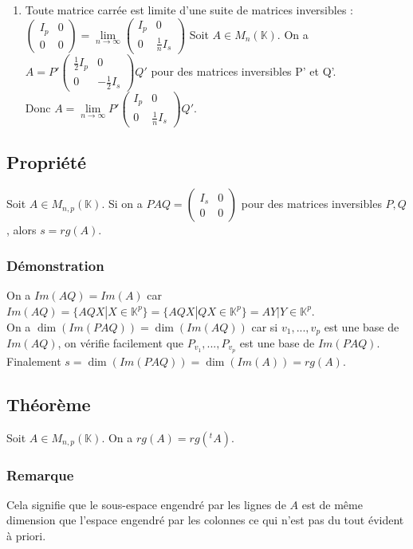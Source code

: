 \documentclass[a4paper,10pt]{book} %
\newcommand{\K}{\mathbb{K}}
\begin{document}
\begin{enumerate}
\item Toute matrice carrée est limite d'une suite de matrices inversibles :
$\begin{pmatrix}
I_p& 0\\
0& 0
\end{pmatrix}=\lim\limits_{n\rightarrow \infty}\begin{pmatrix}
I_p& 0\\
0&\frac{1}{n}I_s
\end{pmatrix}$
Soit $A\in M_n(\K)$. On a $A=P'\begin{pmatrix}
\frac{1}{2}I_p&0\\
0&-\frac{1}{2}I_s
\end{pmatrix}Q'$ pour des matrices inversibles P' et Q'.\\

Donc $A=\lim\limits_{n\rightarrow \infty}P'\begin{pmatrix}
I_p&0\\
0&\frac{1}{n}I_s
\end{pmatrix}Q'$.
\end{enumerate}

\subsection{Propriété}
Soit $A\in M_{n,p}(\mathbb{K})$. Si on a $PAQ=\begin{pmatrix}
I_s& 0\\
0& 0
\end{pmatrix}$ pour des matrices inversibles $P,Q$, alors $s=rg(A)$.

\subsubsection{Démonstration}
On a $Im(AQ)=Im(A)$ car $Im(AQ)=\{AQX|X\in \K^p\}=\{AQX|QX\in \K^p\}={AY|Y\in \K^p}$.\\

On a $\dim(Im(PAQ))=\dim(Im(AQ))$ car si $v_1,...,v_p$ est une base de $Im(AQ)$, on vérifie facilement que $P_{v_1},...,P_{v_p}$ est une base de $Im(PAQ)$.\\
Finalement $s=\dim(Im(PAQ))=\dim(Im(A))=rg(A)$.

\subsection{Théorème}
Soit $A\in M_{n,p}(\K)$. On a $rg(A)=rg(^t A)$.

\subsubsection{Remarque}
Cela signifie que le sous-espace engendré par les lignes de $A$ est de même dimension que l'espace engendré par les colonnes ce qui n'est pas du tout évident à priori.
\end{document}
